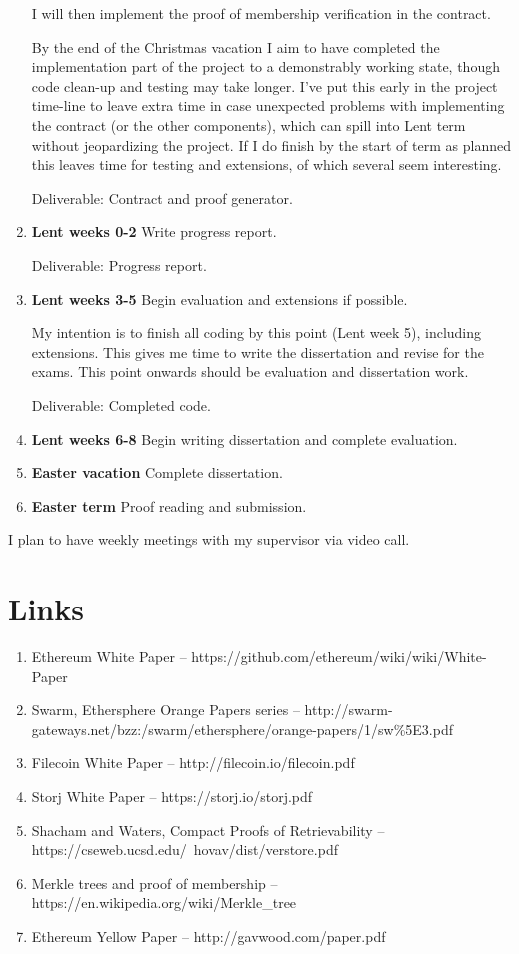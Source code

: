 \documentclass[oneside]{article}
\begin{document}
\begin{enumerate}
I will then implement the proof of membership verification in the contract.

By the end of the Christmas vacation I aim to have completed the implementation part of the project to a demonstrably working state, though code clean-up and testing may take longer.
I've put this early in the project time-line to leave extra time in case unexpected problems with implementing the contract (or the other components), which can spill into Lent term without jeopardizing the project.
If I do finish by the start of term as planned this leaves time for testing and extensions, of which several seem interesting.

Deliverable: Contract and proof generator.

\item \textbf{Lent weeks 0-2} Write progress report.

Deliverable: Progress report.
\item \textbf{Lent weeks 3-5} Begin evaluation and extensions if possible.

My intention is to finish all coding by this point (Lent week 5), including extensions.
This gives me time to write the dissertation and revise for the exams.
This point onwards should be evaluation and dissertation work.

Deliverable: Completed code.

\item \textbf{Lent weeks 6-8} Begin writing dissertation and complete evaluation.
\item \textbf{Easter vacation} Complete dissertation.
\item \textbf{Easter term} Proof reading and submission.
\end{enumerate}


I plan to have weekly meetings with my supervisor via video call.
\section{Links}

\begin{enumerate}
\item Ethereum White Paper -- https://github.com/ethereum/wiki/wiki/White-Paper
\item Swarm, Ethersphere Orange Papers series -- http://swarm-gateways.net/bzz:/swarm/ethersphere/orange-papers/1/sw\%5E3.pdf
\item Filecoin White Paper -- http://filecoin.io/filecoin.pdf
\item Storj White Paper -- https://storj.io/storj.pdf
\item Shacham and Waters, Compact Proofs of Retrievability -- https://cseweb.ucsd.edu/~hovav/dist/verstore.pdf
\item Merkle trees and proof of membership -- https://en.wikipedia.org/wiki/Merkle\_tree
\item Ethereum Yellow Paper -- http://gavwood.com/paper.pdf
\end{enumerate}
\end{document}
